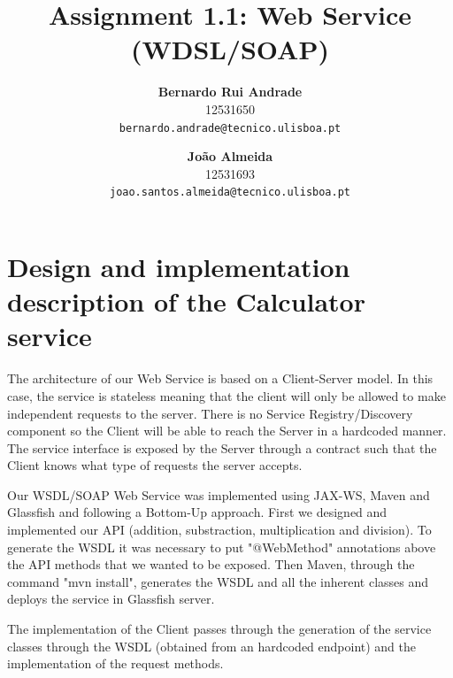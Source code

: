 \documentclass[a4paper]{article}
\begin{document}
\title{Assignment 1.1: Web Service (WDSL/SOAP)}
\author{
  \textbf{Bernardo Rui Andrade}\\
  12531650 \\
  \texttt{bernardo.andrade@tecnico.ulisboa.pt} \\
  \and
  \textbf{João Almeida}\\
 12531693\\
  \texttt{joao.santos.almeida@tecnico.ulisboa.pt} \\
}
\maketitle
\section*{Design and implementation description of the Calculator service}
The architecture of our Web Service is based on a Client-Server model. In this case, the service is stateless meaning that the client will only be allowed to make independent requests to the server. There is no Service Registry/Discovery component so the Client will be able to reach the Server in a hardcoded manner. The service interface is exposed by the Server through a contract such that the Client knows what type of requests the server accepts.\par
Our WSDL/SOAP Web Service was implemented using JAX-WS, Maven and Glassfish and following a Bottom-Up approach. First we designed and implemented our API (addition, substraction, multiplication and division). To generate the WSDL it was necessary to put "@WebMethod" annotations above the API methods that we wanted to be exposed. Then Maven, through the command "mvn install", generates the WSDL and all the inherent classes and deploys the service in Glassfish server.\par
The implementation of the Client passes through the generation of the service classes through the WSDL (obtained from an hardcoded endpoint) and the implementation of the request methods. 
\end{document}
